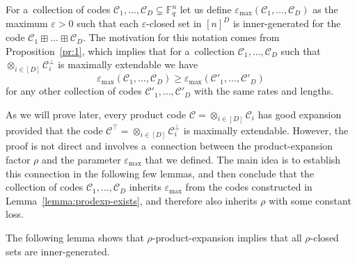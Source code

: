 \documentclass[conference]{IEEEtran}
\let\ge\geqslant
\newcommand{\eps}{\varepsilon}
\theoremstyle{plain}
\theoremstyle{definition}
\theoremstyle{remark}
\newcommand{\cC}{\mathcal{C}}
\newcommand{\F}{\mathbb{F}}
\begin{document}
\newcommand{\epsmax}{\eps_{\max}}

For a~collection of codes $\cC_1,\ldots,\cC_D\subsetneq \F_q^n$ let us define $\epsmax(\cC_1,\ldots,\cC_D)$ as the maximum $\eps>0$ such that each $\eps$-closed set in $[n]^D$ is inner-generated for the code $\cC_1\boxplus\ldots\boxplus\cC_D$. The motivation for this notation comes from Proposition~\ref{pr:1}, which implies that for a~collection $\cC_1,\ldots,\cC_D$ such that $\otimes_{i\in[D]}\cC_i^\perp$ is maximally extendable we have
\begin{equation}\label{eq:expmax-inherit}
\epsmax(\cC_1,\ldots,\cC_D)\ge \epsmax(\cC'_1,\ldots,\cC'_D)
\end{equation}
for any other collection of codes $\cC'_1,\ldots,\cC'_D$ with the same rates and lengths.


As we will prove later, every product code $\cC=\otimes_{i\in[D]}\cC_i$ has good expansion provided that the code $\cC^\top=\otimes_{i\in[D]}\cC_i^\perp$ is maximally extendable.  
However, the proof is not direct and involves a~connection between the product-expansion factor $\rho$ and the parameter $\epsmax$ that we defined. The main idea is to establish this connection in the following few lemmas, and then conclude that the collection of codes $\cC_1,\ldots,\cC_D$ inherits $\epsmax$ from the codes constructed in Lemma~\ref{lemma:prodexp-exists}, and therefore also inherits $\rho$ with some constant loss.



The following lemma shows that $\rho$-product-expansion implies that all $\rho$-closed sets are inner-generated. 
\end{document}
